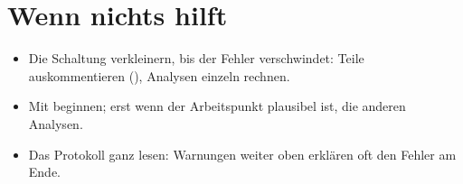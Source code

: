 \section{Wenn nichts hilft}

\begin{itemize}
  \item Die Schaltung verkleinern, bis der Fehler verschwindet: Teile
    auskommentieren (), Analysen einzeln rechnen.
  \item Mit  beginnen; erst wenn der Arbeitspunkt plausibel ist,
    die anderen Analysen.
  \item Das Protokoll ganz lesen: Warnungen weiter oben erklären oft den
    Fehler am Ende.
\end{itemize}
